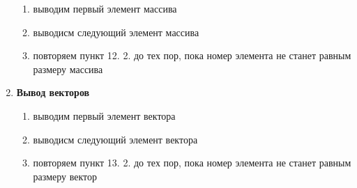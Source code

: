 \documentclass[]{article}
\begin{document}
\begin{enumerate}[1.]
\begin{enumerate}[{12.} 1.]
			\item выводим первый элемент массива
			\item выводисм следующий элемент массива
			\item повторяем пункт 12. 2. до тех пор, пока номер элемента не станет равным размеру массива
		\end{enumerate}
		\item \textbf{Вывод векторов}
		\begin{enumerate}[{12.} 1.]
			\item выводим первый элемент вектора
			\item выводисм следующий элемент вектора
			\item повторяем пункт 13. 2. до тех пор, пока номер элемента не станет равным размеру вектор
		\end{enumerate}
	\end{enumerate}
\end{document}
